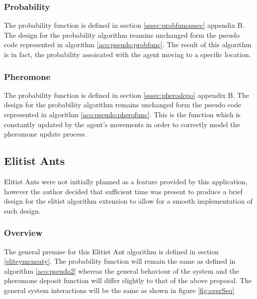 \subsubsection{Probability}

The probability function is defined in section \ref{sssec:probfuncsssec} appendix B. The design for the probability algorithm reamins unchanged form the pseudo code represented in algorithm \ref{aco:pseudo:probfunc}. The result of this algorithm is in fact, the probability assoicated with the agent moving to a specific location.

\subsubsection{Pheromone}

The probability function is defined in section \ref{sssec:pherodepo} appendix B. The design for the probability algorithm remains unchanged form the pseudo code represented in algorithm \ref{aco:pseudo:pherofunc}. This is the function which is constantly updated by the agent’s movements in order to correctly model the pheromone update process.

\subsection{Elitist Ants}

Elitist Ants were not initially planned as a feature provided by this application, however the author decided that sufficient time was present to produce a brief design for the elitist algorithm extension to allow for a smooth implementation of such design.

\subsubsection{Overview}

The general premise for this Elitist Ant algorithm is defined in section \ref{eliteymcneaty}. The probability function will remain the same as defined in algorithm \ref{aco:pseudo2} whereas the general behaviour of the system and the pheromone deposit function will differ slightly to that of the above proposal. The general system interactions will be the same as shown in figure \ref{fig:overSeq}


